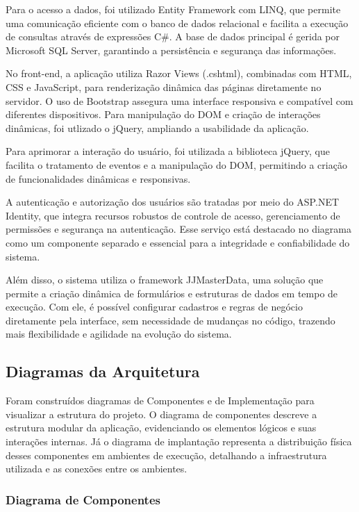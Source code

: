\documentclass[
	12pt,				%
	openany,			%
	twoside,			%
	a4paper,			%
	english,			%
	brazil				%
	]{abntex2}
\begin{document}
Para o acesso a dados, foi utilizado Entity Framework com LINQ, que permite uma comunicação eficiente com o banco de dados relacional e facilita a execução de consultas através de expressões C\#. A base de dados principal é gerida por Microsoft SQL Server, garantindo a persistência e segurança das informações.

No front-end, a aplicação utiliza Razor Views (.cshtml), combinadas com HTML, CSS e JavaScript, para renderização dinâmica das páginas diretamente no servidor. O uso de Bootstrap assegura uma interface responsiva e compatível com diferentes dispositivos. Para manipulação do DOM e criação de interações dinâmicas, foi utlizado o jQuery, ampliando a usabilidade da aplicação.

Para aprimorar a interação do usuário, foi utilizada a biblioteca jQuery, que facilita o tratamento de eventos e a manipulação do DOM, permitindo a criação de funcionalidades dinâmicas e responsivas.

A autenticação e autorização dos usuários são tratadas por meio do ASP.NET Identity, que integra recursos robustos de controle de acesso, gerenciamento de permissões e segurança na autenticação. Esse serviço está destacado no diagrama como um componente separado e essencial para a integridade e confiabilidade do sistema.

Além disso, o sistema utiliza o framework JJMasterData, uma solução que permite a criação dinâmica de formulários e estruturas de dados em tempo de execução. Com ele, é possível configurar cadastros e regras de negócio diretamente pela interface, sem necessidade de mudanças no código, trazendo mais flexibilidade e agilidade na evolução do sistema.

\subsection{Diagramas da Arquitetura}

Foram construídos diagramas de Componentes e de Implementação para visualizar a estrutura do projeto. O diagrama de componentes descreve a estrutura modular da aplicação, evidenciando os elementos lógicos e suas interações internas. Já o diagrama de implantação representa a distribuição física desses componentes em ambientes de execução, detalhando a infraestrutura utilizada e as conexões entre os ambientes.

\subsubsection{Diagrama de Componentes}
\end{document}
